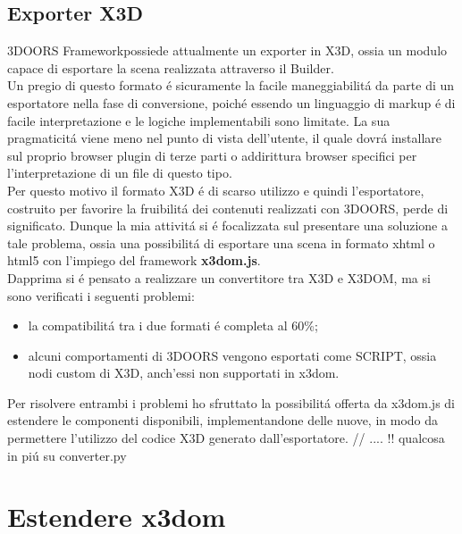 \documentclass[11pt]{article}
\begin{document}
        \clearpage 
        \subsection{Exporter X3D} 
        3DOORS Framework\texttrademark possiede attualmente un exporter in X3D, ossia un modulo capace di esportare la scena realizzata attraverso il Builder. \\
        Un pregio di questo formato é sicuramente la facile maneggiabilitá da parte di un esportatore nella fase di conversione, poiché essendo un linguaggio di markup é di facile interpretazione e le logiche implementabili sono limitate. La sua pragmaticitá viene meno nel punto di vista dell'utente, il quale dovrá installare sul proprio browser plugin di terze parti o addirittura browser specifici per l'interpretazione di un file di questo tipo. \\
        Per questo motivo il formato X3D é di scarso utilizzo e quindi l'esportatore, costruito per favorire la fruibilitá dei contenuti realizzati con 3DOORS, perde di significato. 
        Dunque la mia attivitá si é focalizzata sul presentare una soluzione a tale problema, ossia una possibilitá di esportare una scena in formato xhtml o html5 con l'impiego del framework \textbf{x3dom.js}. \\
        Dapprima si é pensato a realizzare un convertitore tra X3D e X3DOM, ma si sono verificati i seguenti problemi: 
        \begin{itemize}
            \item la compatibilitá tra i due formati é completa al 60\%; 
            \item alcuni comportamenti di 3DOORS vengono esportati come SCRIPT, ossia nodi custom di X3D, anch'essi non supportati in x3dom. 
        \end{itemize}
        Per risolvere entrambi i problemi ho sfruttato la possibilitá offerta da x3dom.js di estendere le componenti disponibili, implementandone delle nuove,  in modo da permettere l'utilizzo del codice X3D generato dall'esportatore.  //
        ....  !! qualcosa in piú su converter.py 
        \clearpage 

\section{Estendere x3dom}
\end{document}

